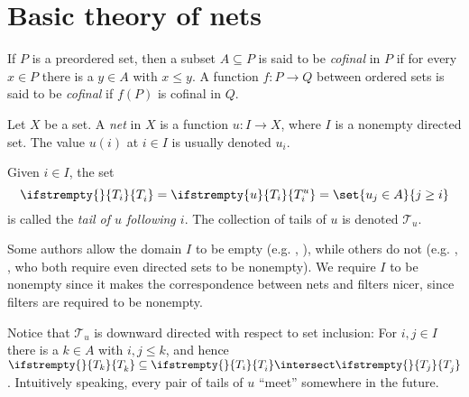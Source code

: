 \documentclass[article, a4paper, 11pt, oneside]{memoir}
\title{\doctitle}
\author{\docauthor}
\numberwithin{equation}{chapter}
\newcommand{\calT}{\mathcal{T}}
\theoremstyle{nonumberplain}
\begin{document}
\maketitle


\chapter{Basic theory of nets}

If $P$ is a preordered set, then a subset $A \subseteq P$ is said to be \emph{cofinal} in $P$ if for every $x \in P$ there is a $y \in A$ with $x \leq y$. A function $f \colon P \to Q$ between ordered sets is said to be \emph{cofinal} if $f(P)$ is cofinal in $Q$.


\newcommand{\mynet}{u}
\newcommand{\subnet}{v}
\newcommand{\altnet}{v}
\newcommand{\newnet}{w}
\newcommand{\mylimit}{x}
\newcommand{\calN}{\mathcal{N}}
\newcommand{\nhoods}[1]{\calN_{#1}}
\newcommand\tail[2][]{%
    \ifstrempty{#1}{%
        T_{#2}
    }{%
        T^{#1}_{#2}
    }%
}
\newcommand{\tails}[1]{\calT_{#1}}

\begin{definition}[Nets]
    Let $X$ be a set. A \emph{net} in $X$ is a function $\mynet \colon I \to X$, where $I$ is a nonempty directed set. The value $\mynet(i)$ at $i \in I$ is usually denoted $\mynet_i$.
    
    Given $i \in I$, the set
    \begin{equation*}
        \tail{i}
            = \tail[\mynet]{i}
            = \set{\mynet_j \in A}{j \geq i}
    \end{equation*}
    is called the \emph{tail of $\mynet$ following $i$}. The collection of tails of $\mynet$ is denoted $\tails{\mynet}$.
\end{definition}
%
Some authors allow the domain $I$ to be empty (e.g. \textcite{willard}, \cite{folland2007}), while others do not (e.g. \cite{kelley1975}, \cite{beardon1997}, who both require even directed sets to be nonempty). We require $I$ to be nonempty since it makes the correspondence between nets and filters nicer, since filters are required to be nonempty.

Notice that $\tails{\mynet}$ is downward directed with respect to set inclusion: For $i, j \in I$ there is a $k \in A$ with $i, j \leq k$, and hence $\tail{k} \subseteq \tail{i} \intersect \tail{j}$. Intuitively speaking, every pair of tails of $\mynet$ \enquote{meet} somewhere in the future.
\end{document}
